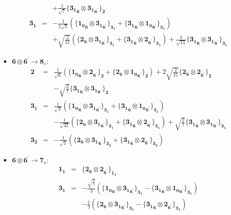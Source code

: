 \documentclass[english]{article}
\newcommand{\subcg}[3]{\big\{ {#1}\otimes{#2}\big\}^{}_{#3}}
\newcommand{\rep}[1]{\mathbf{#1}}
\begin{document}
\begin{itemize}
\begin{eqnarray*}
 & & +\frac{1}{\sqrt{7}}\subcg{\rep{3_1}_{\rep{6}}}{\rep{3_1}_{\rep{6}^{\prime}}}{\rep{2}}
\\
\rep{3_1} &=& -\frac{1}{2 \sqrt{3}}\left(\subcg{\rep{1_0}_{\rep{6}}}{\rep{3_1}_{\rep{6}^{\prime}}}{\rep{3_1}}+\subcg{\rep{3_1}_{\rep{6}}}{\rep{1_0}_{\rep{6}^{\prime}}}{\rep{3_1}}\right) \\ 
 & & +\sqrt{\frac{2}{21}}\left(\subcg{\rep{2}_{\rep{6}}}{\rep{3_1}_{\rep{6}^{\prime}}}{\rep{3_1}}+\subcg{\rep{3_1}_{\rep{6}}}{\rep{2}_{\rep{6}^{\prime}}}{\rep{3_1}}\right)+\frac{3}{\sqrt{14}}\subcg{\rep{3_1}_{\rep{6}}}{\rep{3_1}_{\rep{6}^{\prime}}}{\rep{3_1}}
\end{eqnarray*}
\item $\rep{6}\otimes\rep{6}^{\prime}\to\rep{8}_{s}$:
\begin{eqnarray*}
\rep{2} &=& \frac{1}{\sqrt{6}}\left(\subcg{\rep{1_0}_{\rep{6}}}{\rep{2}_{\rep{6}^{\prime}}}{\rep{2}}+\subcg{\rep{2}_{\rep{6}}}{\rep{1_0}_{\rep{6}^{\prime}}}{\rep{2}}\right)+2 \sqrt{\frac{2}{21}}\subcg{\rep{2}_{\rep{6}}}{\rep{2}_{\rep{6}^{\prime}}}{\rep{2}} \\ 
 & & -\sqrt{\frac{2}{7}}\subcg{\rep{3_1}_{\rep{6}}}{\rep{3_1}_{\rep{6}^{\prime}}}{\rep{2}}
\\
\rep{3_1} &=& \frac{1}{\sqrt{3}}\left(\subcg{\rep{1_0}_{\rep{6}}}{\rep{3_1}_{\rep{6}^{\prime}}}{\rep{3_1}}+\subcg{\rep{3_1}_{\rep{6}}}{\rep{1_0}_{\rep{6}^{\prime}}}{\rep{3_1}}\right) \\ 
 & & -\frac{1}{\sqrt{42}}\left(\subcg{\rep{2}_{\rep{6}}}{\rep{3_1}_{\rep{6}^{\prime}}}{\rep{3_1}}+\subcg{\rep{3_1}_{\rep{6}}}{\rep{2}_{\rep{6}^{\prime}}}{\rep{3_1}}\right)+\sqrt{\frac{2}{7}}\subcg{\rep{3_1}_{\rep{6}}}{\rep{3_1}_{\rep{6}^{\prime}}}{\rep{3_1}}
\\
\rep{3_2} &=& -\frac{1}{\sqrt{2}}\left(\subcg{\rep{2}_{\rep{6}}}{\rep{3_1}_{\rep{6}^{\prime}}}{\rep{3_2}}+\subcg{\rep{3_1}_{\rep{6}}}{\rep{2}_{\rep{6}^{\prime}}}{\rep{3_2}}\right)
\end{eqnarray*}
\item $\rep{6}\otimes\rep{6}^{\prime}\to\rep{7}_{a}$:
\begin{eqnarray*}
\rep{1_1} &=& \subcg{\rep{2}_{\rep{6}}}{\rep{2}_{\rep{6}^{\prime}}}{\rep{1_1}}
\\
\rep{3_1} &=& -\frac{\sqrt{\frac{7}{2}}}{3}\left(\subcg{\rep{1_0}_{\rep{6}}}{\rep{3_1}_{\rep{6}^{\prime}}}{\rep{3_1}}-\subcg{\rep{3_1}_{\rep{6}}}{\rep{1_0}_{\rep{6}^{\prime}}}{\rep{3_1}}\right) \\ 
 & & -\frac{1}{3}\left(\subcg{\rep{2}_{\rep{6}}}{\rep{3_1}_{\rep{6}^{\prime}}}{\rep{3_1}}-\subcg{\rep{3_1}_{\rep{6}}}{\rep{2}_{\rep{6}^{\prime}}}{\rep{3_1}}\right)

\end{eqnarray*}
\end{itemize}
\end{document}
